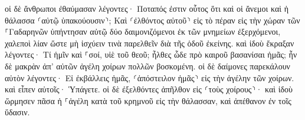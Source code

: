 \documentclass{openreader}
\begin{document}
οἱ δὲ ἄνθρωποι ἐθαύμασαν λέγοντες· Ποταπός ἐστιν οὗτος ὅτι καὶ οἱ ἄνεμοι καὶ ἡ θάλασσα ⸂αὐτῷ ὑπακούουσιν⸃; 
Καὶ ⸂ἐλθόντος αὐτοῦ⸃ εἰς τὸ πέραν εἰς τὴν χώραν τῶν ⸀Γαδαρηνῶν ὑπήντησαν αὐτῷ δύο δαιμονιζόμενοι ἐκ τῶν μνημείων ἐξερχόμενοι, χαλεποὶ λίαν ὥστε μὴ ἰσχύειν τινὰ παρελθεῖν διὰ τῆς ὁδοῦ ἐκείνης. 
καὶ ἰδοὺ ἔκραξαν λέγοντες· Τί ἡμῖν καὶ ⸀σοί, υἱὲ τοῦ θεοῦ; ἦλθες ὧδε πρὸ καιροῦ βασανίσαι ἡμᾶς; 
ἦν δὲ μακρὰν ἀπ’ αὐτῶν ἀγέλη χοίρων πολλῶν βοσκομένη. 
οἱ δὲ δαίμονες παρεκάλουν αὐτὸν λέγοντες· Εἰ ἐκβάλλεις ἡμᾶς, ⸂ἀπόστειλον ἡμᾶς⸃ εἰς τὴν ἀγέλην τῶν χοίρων. 
καὶ εἶπεν αὐτοῖς· Ὑπάγετε. οἱ δὲ ἐξελθόντες ἀπῆλθον εἰς ⸂τοὺς χοίρους⸃· καὶ ἰδοὺ ὥρμησεν πᾶσα ἡ ⸀ἀγέλη κατὰ τοῦ κρημνοῦ εἰς τὴν θάλασσαν, καὶ ἀπέθανον ἐν τοῖς ὕδασιν. 
\end{document}
